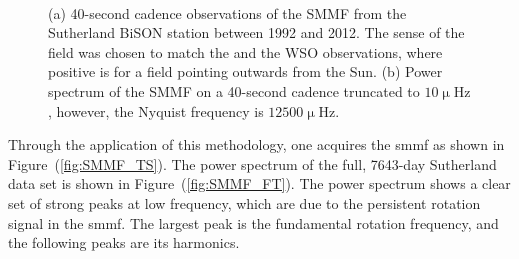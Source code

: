\begin{figure}[ht!]
	\centering
	 \\ 
	\centering
	\caption{(a) 40-second cadence observations of the SMMF from the Sutherland BiSON station between 1992 and 2012. The sense of the field was chosen to match the \citet{chaplin_studies_2003} and the WSO observations, where positive is for a field pointing outwards from the Sun. (b) Power spectrum of the SMMF on a 40-second cadence truncated to $10 \upmu\mathrm{Hz}$, however, the Nyquist frequency is $12500 \upmu\mathrm{Hz}$.}  
	\label{fig:BiSON_SMMF}
\end{figure}

Through the application of this methodology, one acquires the \gls{smmf} as shown in Figure~(\ref{fig:SMMF_TS}). The power spectrum of the full, 7643-day Sutherland data set is shown in Figure~(\ref{fig:SMMF_FT}). The power spectrum shows a clear set of strong peaks at low frequency, which are due to the persistent rotation signal in the \gls{smmf}. The largest peak is the fundamental rotation frequency, and the following peaks are its harmonics.


